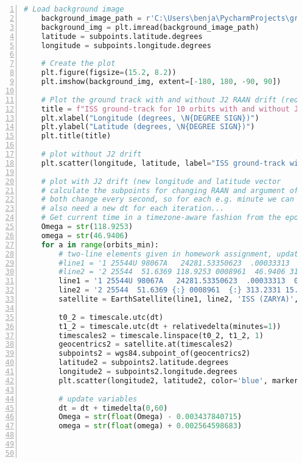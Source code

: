 \begin{appendices}
\begin{lstlisting}[frame=single, language=Python, numbers=left]
    # Load background image
    background_image_path = r'C:\Users\benja\PycharmProjects\groundtrack\earth.jpg'
    background_img = plt.imread(background_image_path)
    latitude = subpoints.latitude.degrees
    longitude = subpoints.longitude.degrees

    # Create the plot
    plt.figure(figsize=(15.2, 8.2))
    plt.imshow(background_img, extent=[-180, 180, -90, 90])

    # Plot the ground track with and without J2 RAAN drift (red and blue)
    title = f"ISS ground-track for 10 orbits with and without J2 - from: {dt:%Y-%m-%d %H:%M:%S %Z}"
    plt.xlabel("Longitude (degrees, \N{DEGREE SIGN})")
    plt.ylabel("Latitude (degrees, \N{DEGREE SIGN})")
    plt.title(title)

    # plot without J2 drift
    plt.scatter(longitude, latitude, label="ISS ground-track without J2 RAAN drift", color='red', marker='o', s=1)

    # plot with J2 drift (new longitude and latitude vector
    # calculate the subpoints for changing RAAN and argument of perigee
    # both change every second, so for each e.g. minute we can calculate a new
    # also need a new dt for each iteration...
    # Get current time in a timezone-aware fashion from the epoch
    Omega = str(118.9253)
    omega = str(46.9406)
    for a in range(orbits_min):
        # two-line elements given in homework assignment, updated according to email
        #line1 = '1 25544U 98067A   24281.53350623  .00033313  00000+0  60150-3 0  9991'
        #line2 = '2 25544  51.6369 118.9253 0008961  46.9406 313.2331 15.49376493475973'
        line1 = '1 25544U 98067A   24281.53350623  .00033313  00000+0  60150-3 0  9991'
        line2 = '2 25544  51.6369 {:} 0008961  {:} 313.2331 15.49376493475973'.format(Omega, omega)
        satellite = EarthSatellite(line1, line2, 'ISS (ZARYA)', timescale)

        t0_2 = timescale.utc(dt)
        t1_2 = timescale.utc(dt + relativedelta(minutes=1))
        timescales2 = timescale.linspace(t0_2, t1_2, 1)
        geocentrics2 = satellite.at(timescales2)
        subpoints2 = wgs84.subpoint_of(geocentrics2)
        latitude2 = subpoints2.latitude.degrees
        longitude2 = subpoints2.longitude.degrees
        plt.scatter(longitude2, latitude2, color='blue', marker='o', s=1)

        # update variables
        dt = dt + timedelta(0,60)
        Omega = str(float(Omega) - 0.003437840715)
        omega = str(float(omega) + 0.002564598683)




\end{lstlisting}
\end{appendices}
